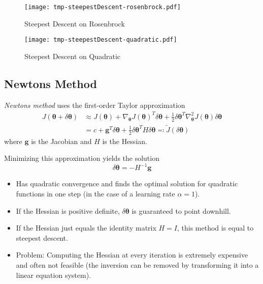 \documentclass[a4paper, 11pt, accentcolor = tud3b]{tudreport}
\renewcommand{\vec}[1]{\mathbf{#1}}
\begin{document}
					\begin{figure}
						\centering
						\texttt{[image: tmp-steepestDescent-rosenbrock.pdf]}
						\caption{Steepest Descent on Rosenbrock}
						\label{fig:steepestDescentExampleRosenbrock}
					\end{figure}
					\begin{figure}
						\centering
						\texttt{[image: tmp-steepestDescent-quadratic.pdf]}
						\caption{Steepest Descent on Quadratic}
						\label{fig:steepestDescentExampleQuadratic}
					\end{figure}

			\subsection{Newtons Method}
				\emph{Newtons method} uses the first-order Taylor approximation
				\begin{align}
					J(\vec{\theta} + \delta\vec{\theta}) &\approx J(\vec{\theta}) + \nabla_{\vec{\theta}} J(\vec{\theta})^T \delta\vec{\theta} + \frac{1}{2} \delta\vec{\theta}^T \nabla_{\vec{\theta}}^2 J(\vec{\theta}) \delta\vec{\theta} \\
						&= c + \vec{g}^T \delta\vec{\theta} + \frac{1}{2} \delta\vec{\theta}^T H \delta\vec{\theta} \eqqcolon \tilde{J}(\delta\vec{\theta})
				\end{align}
				where \(\vec{g}\) is the Jacobian and \(H\) is the Hessian.

				Minimizing this approximation yields the solution
				\begin{equation}
					\delta\vec{\theta} = -H^{-1} \vec{g}
				\end{equation}

				\begin{itemize}
					\item Has quadratic convergence and finds the optimal solution for quadratic functions in one step (in the case of a learning rate \(\alpha = 1\)).
					\item If the Hessian is positive definite, \(\delta\vec{\theta}\) is guaranteed to point downhill.
					\item If the Hessian just equals the identity matrix \( H = I \), this method is equal to steepest descent.
					\item Problem: Computing the Hessian at every iteration is extremely expensive and often not feasible (the inversion can be removed by transforming it into a linear equation system).
				\end{itemize}
\end{document}
